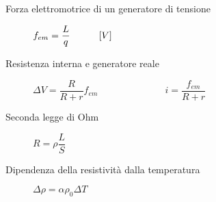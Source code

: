 \documentclass[a4paper,11pt,italian]{article}
\begin{document}
\begin{description}
  \item[Forza elettromotrice di un generatore di tensione] 
%   
  $ f_{em} = \dfrac{L}{q} \hspace*{3em} [V] $
  
  \item[Resistenza interna e generatore reale] 
%   
  $ \Delta V = \dfrac{R}{R+r} f_{em} $~~~~~~~~~~~~~~$ i = \dfrac{f_{em}}{R+r} $
  
  \item[Seconda legge di Ohm] 
  $ R = \rho \dfrac{L}{S} $
  
  \item[Dipendenza della resistività dalla temperatura]
  $ \Delta \rho = \alpha \rho_0 \Delta T  $
  
  
%   
  

\end{description}
\end{document}
